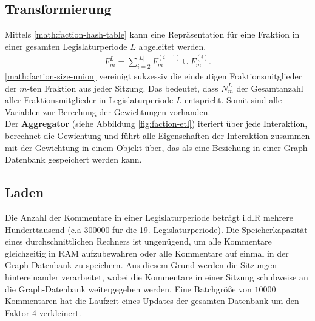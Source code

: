 \subsection{Transformierung}
Mittels \ref{math:faction-hash-table} kann eine Repräsentation für eine Fraktion in einer gesamten Legislaturperiode $L$ abgeleitet werden.
\begin{equation}
    \begin{aligned}
    \label{math:faction-size-union}
    F_{m}^{L} = \sum_{i = 2}^{|L|} F_{m}^{(i-1)} \cup F_{m}^{(i)}.
    \end{aligned}
\end{equation}
\ref{math:faction-size-union} vereinigt sukzessiv die eindeutigen Fraktionsmitglieder der $m$-ten Fraktion aus jeder Sitzung. Das bedeutet, dass $N_m^{L}$ der Gesamtanzahl
aller Fraktionsmitglieder in Legislaturperiode $L$ entspricht. Somit sind alle Variablen zur Berechung der Gewichtungen vorhanden.\\
Der \textbf{Aggregator} (siehe Abbildung \ref{fig:faction-etl}) iteriert über jede Interaktion, berechnet die Gewichtung und führt alle Eigenschaften der
Interaktion zusammen mit der Gewichtung in einem Objekt über, das als eine Beziehung in einer Graph-Datenbank gespeichert werden kann. 
\subsection{Laden}
Die Anzahl der Kommentare in einer Legislaturperiode beträgt i.d.R mehrere Hunderttausend (c.a $300 000$ für die 19. Legislaturperiode). 
Die Speicherkapazität eines durchschnittlichen Rechners ist ungenügend, um alle Kommentare gleichzeitig in RAM aufzubewahren oder alle Kommentare auf einmal 
in der Graph-Datenbank zu speichern. Aus diesem Grund werden die Sitzungen hintereinander verarbeitet, wobei die Kommentare in einer Sitzung schubweise 
an die Graph-Datenbank weitergegeben werden. Eine Batchgröße von $10 000$ Kommentaren hat die Laufzeit eines Updates der gesamten Datenbank um den Faktor 4 verkleinert. %

